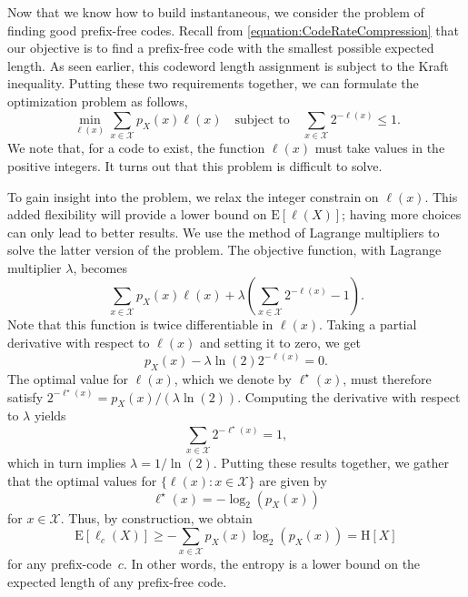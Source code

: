 Now that we know how to build instantaneous, we consider the problem of finding good prefix-free codes.
Recall from \eqref{equation:CodeRateCompression} that our objective is to find a prefix-free code with the smallest possible expected length.
As seen earlier, this codeword length assignment is subject to the Kraft inequality.
Putting these two requirements together, we can formulate the optimization problem as follows,
\begin{equation*}
\min_{\ell(x)} \sum_{x \in \mathcal{X}} p_X(x) \ell(x)
\quad \text{subject to} \quad
\sum_{x \in \mathcal{X}} 2^{- \ell(x)} \leq 1 .
\end{equation*}
We note that, for a code to exist, the function $\ell(x)$ must take values in the positive integers.
It turns out that this problem is difficult to solve.

To gain insight into the problem, we relax the integer constrain on $\ell(x)$.
This added flexibility will provide a lower bound on $\mathrm{E} [\ell(X)]$; having more choices can only lead to better results.
We use the method of Lagrange multipliers to solve the latter version of the problem.
The objective function, with Lagrange multiplier $\lambda$, becomes
\begin{equation*}
\sum_{x \in \mathcal{X}} p_X(x) \ell(x)
+ \lambda \left( \sum_{x \in \mathcal{X}} 2^{- \ell(x)} - 1 \right) .
\end{equation*}
Note that this function is twice differentiable in $\ell(x)$.
Taking a partial derivative with respect to $\ell(x)$ and setting it to zero, we get
\begin{equation*}
p_X(x) - \lambda \ln(2) 2^{- \ell(x)}  = 0 .
\end{equation*}
The optimal value for $\ell(x)$, which we denote by $\ell^{\star}(x)$, must therefore satisfy $2^{- \ell^{\star}(x)} = p_X(x) / (\lambda \ln (2))$.
Computing the derivative with respect to $\lambda$ yields
\begin{equation*}
\sum_{x \in \mathcal{X}} 2^{- \ell^{\star}(x)} = 1 ,
\end{equation*}
which in turn implies $\lambda = 1 / \ln (2)$.
Putting these results together, we gather that the optimal values for $\{ \ell(x) : x \in \mathcal{X} \}$ are given by
\begin{equation*}
\ell^{\star}(x) = - \log_2 (p_X(x))
\end{equation*}
for $x \in \mathcal{X}$.
Thus, by construction, we obtain
\begin{equation*}
\mathrm{E} [\ell_c(X)] \geq - \sum_{x \in \mathcal{X}} p_X(x) \log_2 (p_X(x))
= \mathrm{H}[X]
\end{equation*}
for any prefix-code~$c$.
In other words, the entropy is a lower bound on the expected length of any prefix-free code.


